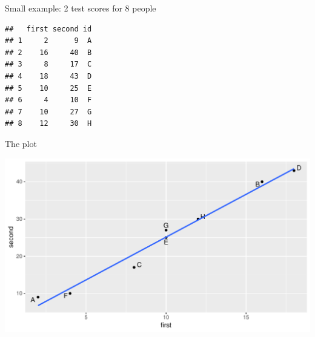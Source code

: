 \begin{frame}[fragile]{Small example: 2 test scores for 8 people}

\begin{knitrout}
\color{fgcolor}\begin{kframe}
\begin{alltt}
\hlkwb{=}\hlstd{(}\hlstd{,}
\end{alltt}
\begin{verbatim}
##   first second id
## 1     2      9  A
## 2    16     40  B
## 3     8     17  C
## 4    18     43  D
## 5    10     25  E
## 6     4     10  F
## 7    10     27  G
## 8    12     30  H
\end{verbatim}
\end{kframe}
\end{knitrout}

\begin{knitrout}
\color{fgcolor}\begin{kframe}
\begin{alltt}
\hlkwb{=}\hlstd{(}\hlopt{+}
  \hlstd{()}\hlopt{+}\hlstd{()}
\end{alltt}
\end{kframe}
\end{knitrout}
    
\end{frame}

\begin{frame}[fragile]{The plot}

\begin{knitrout}
\color{fgcolor}\begin{kframe}
\begin{alltt}
\end{alltt}
\end{kframe}
\includegraphics[width=\maxwidth]{figure/ff2-1} 

\end{knitrout}
  
  
\end{frame}

